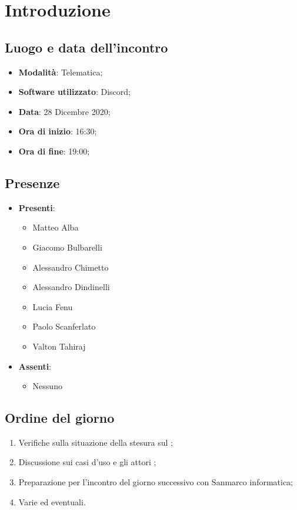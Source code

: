\documentclass[]{article}
\begin{document}
	
	
	
	\newpage
	
	\section{Introduzione}
		\subsection{Luogo e data dell'incontro}
		\begin{itemize}
			\item \textbf{Modalità}: Telematica;
			\item \textbf{Software utilizzato}: Discord;
			\item \textbf{Data}: 28 Dicembre 2020;
			\item \textbf{Ora di inizio}: 16:30;
			\item \textbf{Ora di fine}: 19:00;
		\end{itemize}

		\subsection{Presenze}
		\begin{itemize}
			\item \textbf{Presenti}:
		\begin{itemize}
			\item Matteo Alba
			\item Giacomo Bulbarelli
			\item Alessandro Chimetto
			\item Alessandro Dindinelli
			\item Lucia Fenu
			\item Paolo Scanferlato
			\item Valton Tahiraj
		\end{itemize}
			\item \textbf{Assenti}:
			\begin{itemize}
				\item Nessuno
			\end{itemize}
		\end{itemize}
	
		\subsection{Ordine del giorno}
		\begin{enumerate}
			\item Verifiche sulla situazione della stesura sul ;
			\item Discussione sui casi d'uso e gli attori ;
			\item Preparazione per l'incontro del giorno successivo con Sanmarco informatica;
			\item Varie ed eventuali.
		\end{enumerate}
	
\end{document}

